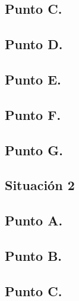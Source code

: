 \documentclass[letterpaper,12pt,onecolumn,titlepage]{article}
\begin{document}
\subsection{Punto C.}
\subsection{Punto D.}
\subsection{Punto E.}
\subsection{Punto F.}
\subsection{Punto G.}

\pagebreak\subsection{Situaci\'{o}n 2}
\subsection{Punto A.}
\subsection{Punto B.}
\subsection{Punto C.}


\end{document}
